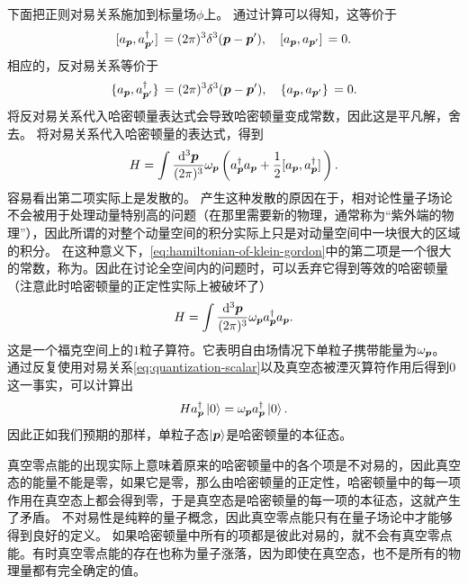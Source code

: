 下面把正则对易关系施加到标量场${\phi}$上。
通过计算可以得知，这等价于
\begin{equation}
    \comm*{{a}_{\vb*{p}}}{{a}^\dagger_{\vb*{p}'}} = (2\pi)^3 \delta^3 (\vb*{p} - \vb*{p}'), \quad \comm*{{a}_{\vb*{p}}}{{a}_{\vb*{p}'}} = 0.
    \label{eq:quantization-scalar}
\end{equation}
相应的，反对易关系等价于
\[
    \acomm*{{a}_{\vb*{p}}}{{a}^\dagger_{\vb*{p}'}} = (2\pi)^3 \delta^3 (\vb*{p} - \vb*{p}'), \quad \acomm*{{a}_{\vb*{p}}}{{a}_{\vb*{p}'}} = 0.
\]
将反对易关系代入哈密顿量表达式会导致哈密顿量变成常数，因此这是平凡解，舍去。
将对易关系代入哈密顿量的表达式，得到
\begin{equation}
    {H} = \int \frac{\dd[3]{\vb*{p}}}{(2\pi)^3} \omega_{\vb*{p}} \left({a}_{\vb*{p}}^\dagger {a}_{\vb*{p}}  + \frac{1}{2} \comm*{{a}_{\vb*{p}}}{{a}^\dagger_{\vb*{p}}} \right).
    \label{eq:hamiltonian-of-klein-gordon}
\end{equation}
容易看出第二项实际上是发散的。
产生这种发散的原因在于，相对论性量子场论不会被用于处理动量特别高的问题（在那里需要新的物理，通常称为“紫外端的物理”），因此所谓的对整个动量空间的积分实际上只是对动量空间中一块很大的区域的积分。
在这种意义下，\eqref{eq:hamiltonian-of-klein-gordon}中的第二项是一个很大的常数，称为。因此在讨论全空间内的问题时，可以丢弃它得到等效的哈密顿量（注意此时哈密顿量的正定性实际上被破坏了）%
\begin{equation}
    {H} = \int \frac{\dd[3]{\vb*{p}}}{(2\pi)^3} \omega_{\vb*{p}} {a}_{\vb*{p}}^\dagger {a}_{\vb*{p}}.
\end{equation}
这是一个福克空间上的$1$粒子算符。它表明自由场情况下单粒子携带能量为$\omega_{\vb*{p}}$。
通过反复使用对易关系\eqref{eq:quantization-scalar}以及真空态被湮灭算符作用后得到$0$这一事实，可以计算出
\begin{equation}
    {H} {a}_{\vb*{p}}^\dagger \ket{0} = \omega_{\vb*{p}} {a}_{\vb*{p}}^\dagger \ket{0}.
\end{equation}
因此正如我们预期的那样，单粒子态$\ket{\vb*{p}}$是哈密顿量的本征态。

真空零点能的出现实际上意味着原来的哈密顿量中的各个项是不对易的，因此真空态的能量不能是零，如果它是零，那么由哈密顿量的正定性，哈密顿量中的每一项作用在真空态上都会得到零，于是真空态是哈密顿量的每一项的本征态，这就产生了矛盾。
不对易性是纯粹的量子概念，因此真空零点能只有在量子场论中才能够得到良好的定义。
如果哈密顿量中所有的项都是彼此对易的，就不会有真空零点能。有时真空零点能的存在也称为量子涨落，因为即使在真空态，也不是所有的物理量都有完全确定的值。

